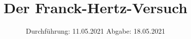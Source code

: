 

\subject{V601}
\title{Der Franck-Hertz-Versuch}
\date{%
  Durchführung: 11.05.2021
  \hspace{3em}
  Abgabe: 18.05.2021
}



\maketitle
\thispagestyle{empty}
\tableofcontents
\newpage







\printbibliography{}



